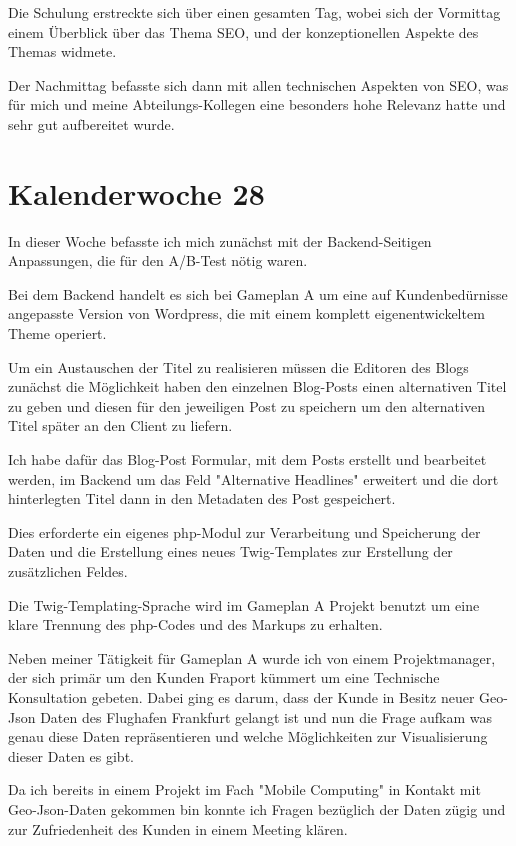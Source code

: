 \documentclass[11pt]{article} %
\begin{document}
Die Schulung erstreckte sich über einen gesamten Tag, wobei sich der Vormittag einem Überblick über das Thema SEO, und der konzeptionellen
Aspekte des Themas widmete. 

Der Nachmittag befasste sich dann mit allen technischen Aspekten von SEO, was für mich und meine Abteilungs-Kollegen eine besonders hohe Relevanz hatte und sehr gut aufbereitet wurde.

\section{Kalenderwoche 28} \label{sec:kw28}

In dieser Woche befasste ich mich zunächst mit der Backend-Seitigen Anpassungen, die für den A/B-Test nötig waren.

Bei dem Backend handelt es sich bei Gameplan A um eine auf Kundenbedürnisse angepasste Version von Wordpress, die mit einem komplett eigenentwickeltem Theme operiert.

Um ein Austauschen der Titel zu realisieren müssen die Editoren des Blogs zunächst die Möglichkeit haben den einzelnen Blog-Posts einen alternativen Titel zu geben und diesen für den jeweiligen Post zu speichern um den alternativen Titel später an den Client zu liefern.

Ich habe dafür das Blog-Post Formular, mit dem Posts erstellt und bearbeitet werden, im Backend um das Feld "Alternative Headlines" erweitert und die dort hinterlegten Titel dann in den Metadaten des Post gespeichert.

Dies erforderte ein eigenes php-Modul zur Verarbeitung und Speicherung der Daten und die Erstellung eines neues Twig-Templates zur Erstellung der zusätzlichen Feldes.

Die Twig-Templating-Sprache wird im Gameplan A Projekt benutzt um eine klare Trennung des php-Codes und des Markups zu erhalten.

Neben meiner Tätigkeit für Gameplan A wurde ich von einem Projektmanager, der sich primär um den Kunden Fraport kümmert um eine Technische Konsultation gebeten. Dabei ging es darum, dass der Kunde in Besitz neuer Geo-Json Daten des Flughafen Frankfurt gelangt ist und nun die Frage aufkam was genau diese Daten repräsentieren und welche Möglichkeiten zur Visualisierung dieser Daten es gibt.

Da ich bereits in einem Projekt im Fach "Mobile Computing" in Kontakt mit Geo-Json-Daten gekommen bin konnte ich Fragen bezüglich der Daten zügig und zur Zufriedenheit des Kunden in einem Meeting klären.
\end{document}
